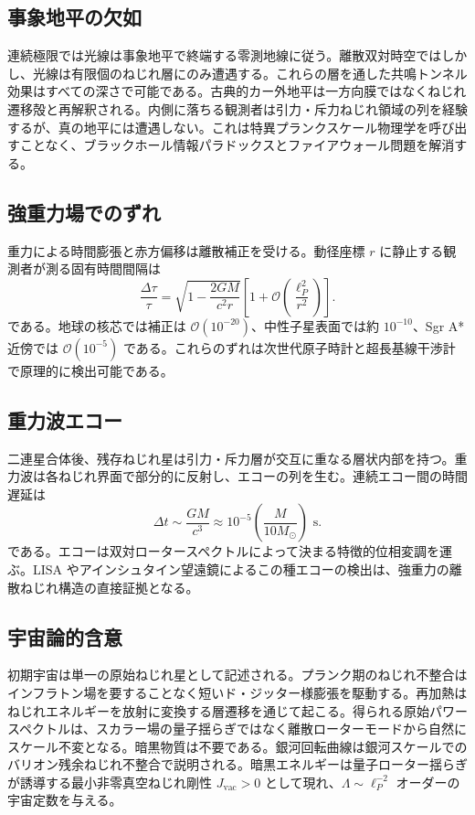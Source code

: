 \documentclass[a4paper]{article}
\begin{document}
\subsection{事象地平の欠如}

連続極限では光線は事象地平で終端する零測地線に従う。離散双対時空ではしかし、光線は有限個のねじれ層にのみ遭遇する。これらの層を通した共鳴トンネル効果はすべての深さで可能である。古典的カー外地平は一方向膜ではなくねじれ遷移殻と再解釈される。内側に落ちる観測者は引力・斥力ねじれ領域の列を経験するが、真の地平には遭遇しない。これは特異プランクスケール物理学を呼び出すことなく、ブラックホール情報パラドックスとファイアウォール問題を解消する。

\subsection{強重力場でのずれ}

重力による時間膨張と赤方偏移は離散補正を受ける。動径座標 $r$ に静止する観測者が測る固有時間間隔は
\[
\frac{\Delta\tau}{\tau} = \sqrt{1 - \frac{2GM}{c^2 r}} \left[ 1 + \mathcal{O}\left( \frac{\ell_P^2}{r^2} \right) \right].
\]
である。地球の核芯では補正は $\mathcal{O}(10^{-20})$、中性子星表面では約 $10^{-10}$、Sgr A* 近傍では $\mathcal{O}(10^{-5})$ である。これらのずれは次世代原子時計と超長基線干渉計で原理的に検出可能である。

\subsection{重力波エコー}

二連星合体後、残存ねじれ星は引力・斥力層が交互に重なる層状内部を持つ。重力波は各ねじれ界面で部分的に反射し、エコーの列を生む。連続エコー間の時間遅延は
\[
\Delta t \sim \frac{GM}{c^3} \approx 10^{-5} \left( \frac{M}{10 M_\odot} \right) \text{ s}.
\]
である。エコーは双対ロータースペクトルによって決まる特徴的位相変調を運ぶ。LISA やアインシュタイン望遠鏡によるこの種エコーの検出は、強重力の離散ねじれ構造の直接証拠となる。

\subsection{宇宙論的含意}

初期宇宙は単一の原始ねじれ星として記述される。プランク期のねじれ不整合はインフラトン場を要することなく短いド・ジッター様膨張を駆動する。再加熱はねじれエネルギーを放射に変換する層遷移を通じて起こる。得られる原始パワースペクトルは、スカラー場の量子揺らぎではなく離散ローターモードから自然にスケール不変となる。暗黒物質は不要である。銀河回転曲線は銀河スケールでのバリオン残余ねじれ不整合で説明される。暗黒エネルギーは量子ローター揺らぎが誘導する最小非零真空ねじれ剛性 $J_\text{vac} > 0$ として現れ、$\Lambda \sim \ell_P^{-2}$ オーダーの宇宙定数を与える。
\end{document}

